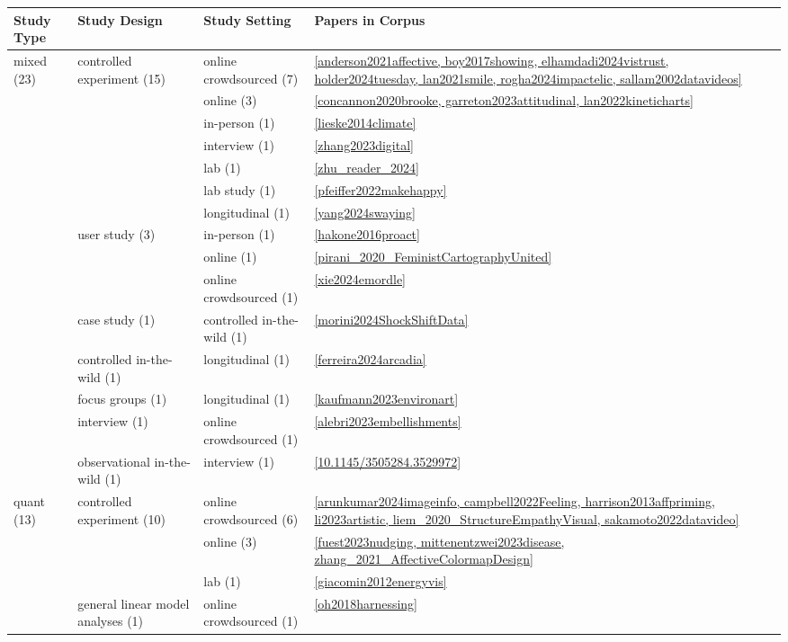 \begin{tabular}{|l|l|l|l|}
\toprule
Study Type & Study Design & Study Setting & Papers in Corpus \\
\midrule
\multirow{15}{*}{mixed (23)} & \multirow{7}{*}{controlled experiment (15)} & online crowdsourced (7) & \ref{anderson2021affective, boy2017showing, elhamdadi2024vistrust, holder2024tuesday, lan2021smile, rogha2024impactelic, sallam2002datavideos} \\
& & online (3) & \ref{concannon2020brooke, garreton2023attitudinal, lan2022kineticharts} \\
& & in-person (1) & \ref{lieske2014climate} \\
& & interview (1) & \ref{zhang2023digital} \\
& & lab (1) & \ref{zhu_reader_2024} \\
& & lab study (1) & \ref{pfeiffer2022makehappy} \\
& & longitudinal (1) & \ref{yang2024swaying} \\ \hline
& \multirow{3}{*}{user study (3)} & in-person (1) & \ref{hakone2016proact} \\
& & online (1) & \ref{pirani_2020_FeministCartographyUnited} \\
& & online crowdsourced (1) & \ref{xie2024emordle} \\ \hline
& case study (1) & controlled in-the-wild (1) & \ref{morini2024ShockShiftData} \\ \hline
& controlled in-the-wild (1) & longitudinal (1) & \ref{ferreira2024arcadia} \\ \hline
& focus groups (1) & longitudinal (1) & \ref{kaufmann2023environart} \\ \hline
& interview (1) & online crowdsourced (1) & \ref{alebri2023embellishments} \\ \hline
& observational in-the-wild (1) & interview (1) & \ref{10.1145/3505284.3529972} \\ \hline
\multirow{6}{*}{quant (13)} & \multirow{3}{*}{controlled experiment (10)} & online crowdsourced (6) & \ref{arunkumar2024imageinfo, campbell2022Feeling, harrison2013affpriming, li2023artistic, liem_2020_StructureEmpathyVisual, sakamoto2022datavideo} \\
& & online (3) & \ref{fuest2023nudging, mittenentzwei2023disease, zhang_2021_AffectiveColormapDesign} \\
& & lab (1) & \ref{giacomin2012energyvis} \\ \hline
& general linear model analyses (1) & online crowdsourced (1) & \ref{oh2018harnessing} \\ \hline

\end{tabular}
